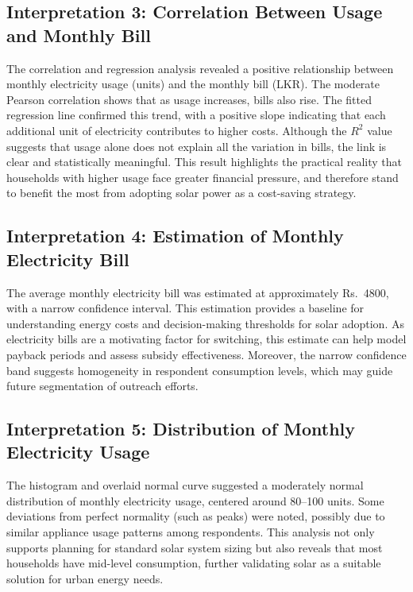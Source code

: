 \documentclass[12pt,a4paper]{article}
\begin{document}
\subsection*{Interpretation 3: Correlation Between Usage and Monthly Bill}

The correlation and regression analysis revealed a positive relationship between monthly electricity usage (units) and the monthly bill (LKR). The moderate Pearson correlation shows that as usage increases, bills also rise. The fitted regression line confirmed this trend, with a positive slope indicating that each additional unit of electricity contributes to higher costs. Although the $R^2$ value suggests that usage alone does not explain all the variation in bills, the link is clear and statistically meaningful. This result highlights the practical reality that households with higher usage face greater financial pressure, and therefore stand to benefit the most from adopting solar power as a cost-saving strategy.


\subsection*{Interpretation 4: Estimation of Monthly Electricity Bill}

The average monthly electricity bill was estimated at approximately Rs.~4800, with a narrow confidence interval. This estimation provides a baseline for understanding energy costs and decision-making thresholds for solar adoption. As electricity bills are a motivating factor for switching, this estimate can help model payback periods and assess subsidy effectiveness. Moreover, the narrow confidence band suggests homogeneity in respondent consumption levels, which may guide future segmentation of outreach efforts.

\subsection*{Interpretation 5: Distribution of Monthly Electricity Usage}

The histogram and overlaid normal curve suggested a moderately normal distribution of monthly electricity usage, centered around 80--100 units. Some deviations from perfect normality (such as peaks) were noted, possibly due to similar appliance usage patterns among respondents. This analysis not only supports planning for standard solar system sizing but also reveals that most households have mid-level consumption, further validating solar as a suitable solution for urban energy needs.
\end{document}

